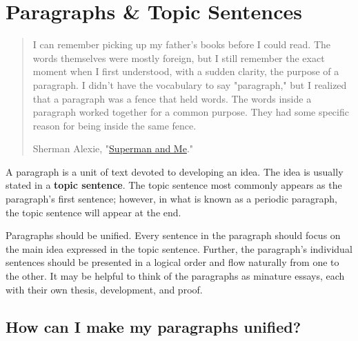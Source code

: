 \hypertarget{organization}{}
\chapter{Paragraphs \& Topic Sentences}

\begin{quote}
\small
I can remember picking up my father's books before I could read. The words themselves were mostly foreign, but I still remember the exact moment when I first understood, with a sudden clarity, the purpose of a paragraph. I didn't have the vocabulary to say "paragraph," but I realized that a paragraph was a fence that held words. The words inside a paragraph worked together for a common purpose. They had some specific reason for being inside the same fence.

\textemdash Sherman Alexie, "\href{http://articles.latimes.com/1998/apr/19/books/bk-42979}{Superman and Me}."

\end{quote}

A paragraph is a unit of text devoted to developing an idea. The idea is usually stated 
in a \textbf{topic sentence}. The topic sentence most commonly appears as the paragraph's first sentence;
however, in what is known as a periodic paragraph, the topic sentence will appear at the end.

Paragraphs should be unified. Every sentence in the paragraph should focus on the main idea expressed in the topic sentence. Further, the paragraph's individual sentences should be presented in a logical order and flow naturally from one to the other. It may be helpful to think of the paragraphs as minature essays, each with their own thesis, development, and proof. 

\section{How can I make my paragraphs unified?}

